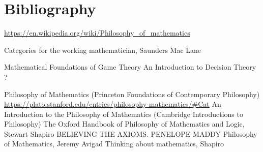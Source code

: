 \documentclass{report}
\begin{document}
\chapter{Bibliography}

\url{https://en.wikipedia.org/wiki/Philosophy_of_mathematics}

Categories for the working mathematician, Saunders Mac Lane

Mathematical Foundations of Game Theory
An Introduction to Decision Theory ?

Philosophy of Mathematics (Princeton Foundations of Contemporary Philosophy)
\url{https://plato.stanford.edu/entries/philosophy-mathematics/#Cat}
An Introduction to the Philosophy of Mathematics (Cambridge Introductions to Philosophy)
The Oxford Handbook of Philosophy of Mathematics and Logic, Stewart Shapiro
BELIEVING THE AXIOMS. PENELOPE MADDY
Philosophy of Mathematics, Jeremy Avigad
Thinking about mathematics, Shapiro
\end{document}
